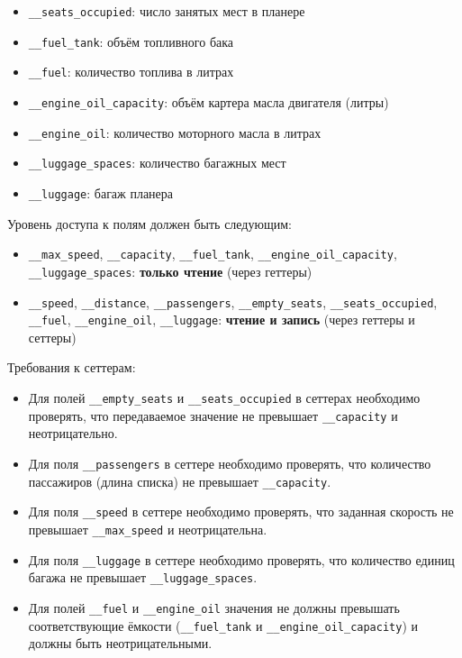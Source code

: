 \begin{enumerate}
\begin{itemize}
    \item \texttt{\_\_seats\_occupied}: число занятых мест в планере  
    \item \texttt{\_\_fuel\_tank}: объём топливного бака  
    \item \texttt{\_\_fuel}: количество топлива в литрах  
    \item \texttt{\_\_engine\_oil\_capacity}: объём картера масла двигателя (литры)  
    \item \texttt{\_\_engine\_oil}: количество моторного масла в литрах  
    \item \texttt{\_\_luggage\_spaces}: количество багажных мест  
    \item \texttt{\_\_luggage}: багаж планера  
\end{itemize}
Уровень доступа к полям должен быть следующим:
\begin{itemize}
    \item \texttt{\_\_max\_speed}, \texttt{\_\_capacity}, \texttt{\_\_fuel\_tank}, \texttt{\_\_engine\_oil\_capacity}, \texttt{\_\_luggage\_spaces}: \textbf{только чтение} (через геттеры)  
    \item \texttt{\_\_speed}, \texttt{\_\_distance}, \texttt{\_\_passengers}, \texttt{\_\_empty\_seats}, \texttt{\_\_seats\_occupied}, \texttt{\_\_fuel}, \texttt{\_\_engine\_oil}, \texttt{\_\_luggage}: \textbf{чтение и запись} (через геттеры и сеттеры)
\end{itemize}
Требования к сеттерам:
\begin{itemize}
    \item Для полей \texttt{\_\_empty\_seats} и \texttt{\_\_seats\_occupied} в сеттерах необходимо проверять, что передаваемое значение не превышает \texttt{\_\_capacity} и неотрицательно.  
    \item Для поля \texttt{\_\_passengers} в сеттере необходимо проверять, что количество пассажиров (длина списка) не превышает \texttt{\_\_capacity}.  
    \item Для поля \texttt{\_\_speed} в сеттере необходимо проверять, что заданная скорость не превышает \texttt{\_\_max\_speed} и неотрицательна.  
    \item Для поля \texttt{\_\_luggage} в сеттере необходимо проверять, что количество единиц багажа не превышает \texttt{\_\_luggage\_spaces}.
    \item Для полей \texttt{\_\_fuel} и \texttt{\_\_engine\_oil} значения не должны превышать соответствующие ёмкости (\texttt{\_\_fuel\_tank} и \texttt{\_\_engine\_oil\_capacity}) и должны быть неотрицательными.

\end{itemize}
\end{enumerate}
